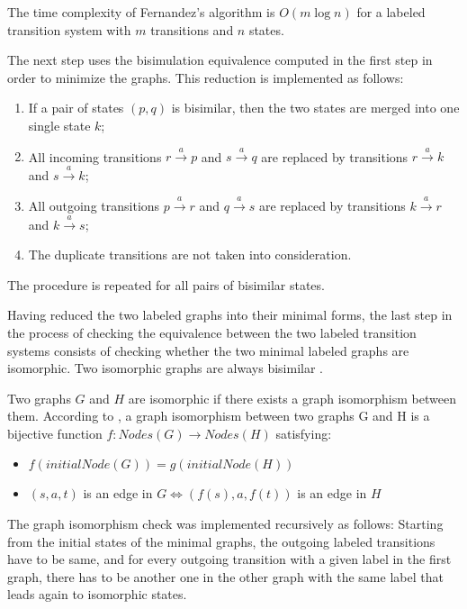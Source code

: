 The time complexity of Fernandez's algorithm is $O(m \log n)$ for a labeled transition system 
with $m$ transitions and $n$ states. 

The next step uses the bisimulation equivalence computed in the first step in order to minimize the graphs. This reduction 
is implemented as follows:
\begin{enumerate}
	\item If a pair of states $(p, q)$ is bisimilar, then the two states are merged into one single state $k$;
	\item All incoming transitions $r \stackrel{a}{\rightarrow} p$ and $s \stackrel{a}{\rightarrow} q$ are replaced by transitions $r \stackrel{a}{\rightarrow} k$ and $s \stackrel{a}{\rightarrow} k$;
	\item All outgoing transitions $p \stackrel{a}{\rightarrow} r$ and $q \stackrel{a}{\rightarrow} s$ are replaced by transitions $k \stackrel{a}{\rightarrow} r$ and $k \stackrel{a}{\rightarrow} s$;
	\item The duplicate transitions are not taken into consideration.
\end{enumerate}
The procedure is repeated for all pairs of bisimilar states.

Having reduced the two labeled graphs into their minimal forms, the last step in the process of checking the equivalence
between the two labeled transition systems consists of checking whether the two minimal labeled graphs are isomorphic.
Two isomorphic graphs are always bisimilar \cite{HandbookProcessAlgebra2}.

Two graphs $G$ and $H$ are isomorphic if there exists a graph isomorphism between them. According to \cite{HandbookProcessAlgebra1}, 
a graph isomorphism between two graphs G and H is a bijective function $f: Nodes(G) \rightarrow Nodes(H)$ satisfying:
\begin{itemize}
	\item $f(initialNode(G)) = g(initialNode(H))$
	\item $(s, a, t)$ is an edge in $G \Leftrightarrow (f(s), a, f(t))$ is an edge in $H$
\end{itemize}

The graph isomorphism check was implemented recursively as follows: Starting from the initial states of the minimal graphs, 
the outgoing labeled transitions have to be same, and for every outgoing transition with a given label in the first graph, 
there has to be another one in the other graph with the same label that leads again to isomorphic states. 

